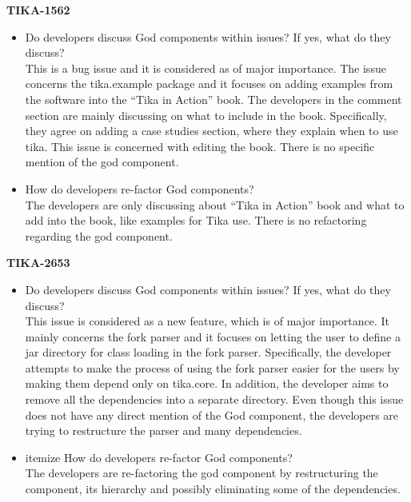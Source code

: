 \documentclass{article}
\begin{document}
\textbf{TIKA-1562}
\begin{itemize}
    \item Do developers discuss God components within issues? If yes, what do they discuss?\\
    This is a bug issue and it is considered as of major importance. The issue concerns the tika.example package and it focuses on adding examples from the software into the “Tika in Action” book. The developers in the comment section are mainly discussing on what to include in the book. Specifically, they agree on adding a case studies section, where they explain when to use tika. This issue is concerned with editing the book. There is no specific mention of the god component. 
    \item How do developers re-factor God components?\\
    The developers are only discussing about “Tika in Action” book and what to add into the book, like examples for Tika use. There is no refactoring regarding the god component.
\end{itemize}

\textbf{TIKA-2653}
\begin{itemize}
    \item Do developers discuss God components within issues? If yes, what do they discuss?\\
    This issue is considered as a new feature, which is of major importance. It mainly concerns the fork parser and it focuses on letting the user to define a jar directory for class loading in the fork parser. Specifically, the developer attempts to make the process of using the fork parser easier for the users by making them depend only on tika.core. In addition, the developer aims to remove all the dependencies into a separate directory.  Even though this issue does not have any direct mention of the God component, the developers are trying to restructure the parser and many dependencies.
    \item{itemize}	How do developers re-factor God components?\\
    The developers are re-factoring the god component by restructuring the component, its hierarchy and possibly eliminating some of the dependencies.  
\end{itemize}
\end{document}
